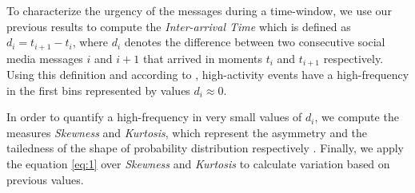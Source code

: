 \documentclass[sigconf]{acmart}
\begin{document}
To characterize the urgency of the messages during a time-window, we use our previous results \cite{DBLP:conf/fdia/Sarmiento17} to compute the \textit{Inter-arrival Time} which is defined as $d_{i} = t_{i+1} - t_{i}$, where $d_{i}$ denotes the difference between two consecutive social media messages $i$ and $i+1$ that arrived in moments $t_{i}$ and $t_{i+1}$ respectively. Using this definition and according to \cite{kalyanam2016prediction}, high-activity events have a high-frequency in the first bins represented by values $d_{i} \approx 0$. 

In order to quantify a high-frequency in very small values of $d_{i}$, we compute the measures \textit{Skewness} and \textit{Kurtosis}, which represent the asymmetry and the tailedness of the shape of probability distribution respectively \cite{mardia1970measures}. Finally, we apply the equation \ref{eq:1} over \textit{Skewness} and \textit{Kurtosis} to calculate variation based on previous values.


\end{document}
